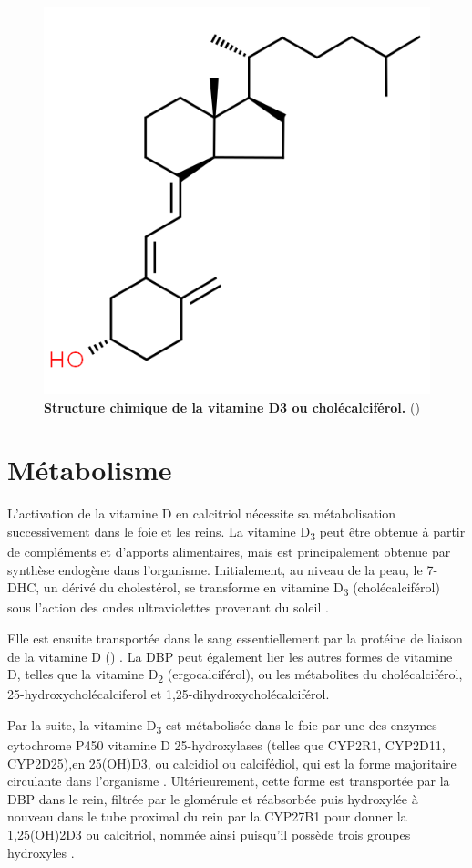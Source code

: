 \documentclass[
  a4paper,
  DIV=11,
  numbers=noendperiod,
  listof=totoc]{scrreprt}
\begin{document}
\begin{figure}
\centering
\includegraphics[width=0.7\columnwidth]{figures/cholecalciferol-chemspider.png} 
\caption[Structure chimique de la vitamine D3 ou cholécalciférol.]{\textbf{Structure chimique de la vitamine D3 ou cholécalciférol.} (\cite{chemspider.2023})}
\label{fig:vitd3}
\end{figure}

\section{Métabolisme}\label{sec-metabolisme}

L'activation de la vitamine D en calcitriol nécessite sa métabolisation
successivement dans le foie et les reins. La vitamine D\textsubscript{3}
peut être obtenue à partir de compléments et d'apports alimentaires,
mais est principalement obtenue par synthèse endogène dans l'organisme.
Initialement, au niveau de la peau, le \ac{7-DHC}, un dérivé du
cholestérol, se transforme en vitamine D\textsubscript{3}
(cholécalciférol) sous l'action des ondes ultraviolettes provenant du
soleil \autocite{Bikle.2014}.

Elle est ensuite transportée dans le sang essentiellement par la
protéine de liaison de la vitamine D ()
\autocite{Christakos.2010,Chun.2012}. La \ac{DBP} peut également lier
les autres formes de vitamine D, telles que la vitamine
D\textsubscript{2} (ergocalciférol), ou les métabolites du
cholécalciférol, 25-hydroxycholécalciferol et
1,25-dihydroxycholécalciférol.

Par la suite, la vitamine D\textsubscript{3} est métabolisée dans le
foie par une des enzymes cytochrome P450 vitamine D 25-hydroxylases
(telles que CYP2R1, CYP2D11, CYP2D25),en \ac{25(OH)D3}, ou calcidiol ou
calcifédiol, qui est la forme majoritaire circulante dans l'organisme
\autocite{Norman.2008,Christakos.2010}. Ultérieurement, cette forme est
transportée par la \ac{DBP} dans le rein, filtrée par le glomérule et
réabsorbée puis hydroxylée à nouveau dans le tube proximal du rein par
la \ac{CYP27B1} pour donner la \ac{1,25(OH)2D3} ou calcitriol, nommée
ainsi puisqu'il possède trois groupes hydroxyles
\autocite{Norman.2008,Dankers.2017}.
\end{document}
